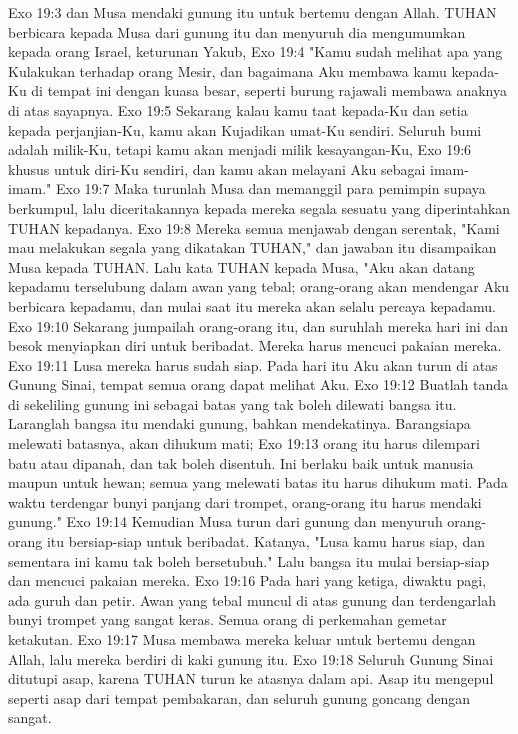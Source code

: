 Exo 19:3  dan Musa mendaki gunung itu untuk bertemu dengan Allah. TUHAN berbicara kepada Musa dari gunung itu dan menyuruh dia mengumumkan kepada orang Israel, keturunan Yakub,
Exo 19:4  "Kamu sudah melihat apa yang Kulakukan terhadap orang Mesir, dan bagaimana Aku membawa kamu kepada-Ku di tempat ini dengan kuasa besar, seperti burung rajawali membawa anaknya di atas sayapnya.
Exo 19:5  Sekarang kalau kamu taat kepada-Ku dan setia kepada perjanjian-Ku, kamu akan Kujadikan umat-Ku sendiri. Seluruh bumi adalah milik-Ku, tetapi kamu akan menjadi milik kesayangan-Ku,
Exo 19:6  khusus untuk diri-Ku sendiri, dan kamu akan melayani Aku sebagai imam-imam."
Exo 19:7  Maka turunlah Musa dan memanggil para pemimpin supaya berkumpul, lalu diceritakannya kepada mereka segala sesuatu yang diperintahkan TUHAN kepadanya.
Exo 19:8  Mereka semua menjawab dengan serentak, "Kami mau melakukan segala yang dikatakan TUHAN," dan jawaban itu disampaikan Musa kepada TUHAN. Lalu kata TUHAN kepada Musa, "Aku akan datang kepadamu terselubung dalam awan yang tebal; orang-orang akan mendengar Aku berbicara kepadamu, dan mulai saat itu mereka akan selalu percaya kepadamu.
Exo 19:10  Sekarang jumpailah orang-orang itu, dan suruhlah mereka hari ini dan besok menyiapkan diri untuk beribadat. Mereka harus mencuci pakaian mereka.
Exo 19:11  Lusa mereka harus sudah siap. Pada hari itu Aku akan turun di atas Gunung Sinai, tempat semua orang dapat melihat Aku.
Exo 19:12  Buatlah tanda di sekeliling gunung ini sebagai batas yang tak boleh dilewati bangsa itu. Laranglah bangsa itu mendaki gunung, bahkan mendekatinya. Barangsiapa melewati batasnya, akan dihukum mati;
Exo 19:13  orang itu harus dilempari batu atau dipanah, dan tak boleh disentuh. Ini berlaku baik untuk manusia maupun untuk hewan; semua yang melewati batas itu harus dihukum mati. Pada waktu terdengar bunyi panjang dari trompet, orang-orang itu harus mendaki gunung."
Exo 19:14  Kemudian Musa turun dari gunung dan menyuruh orang-orang itu bersiap-siap untuk beribadat. Katanya, "Lusa kamu harus siap, dan sementara ini kamu tak boleh bersetubuh." Lalu bangsa itu mulai bersiap-siap dan mencuci pakaian mereka.
Exo 19:16  Pada hari yang ketiga, diwaktu pagi, ada guruh dan petir. Awan yang tebal muncul di atas gunung dan terdengarlah bunyi trompet yang sangat keras. Semua orang di perkemahan gemetar ketakutan.
Exo 19:17  Musa membawa mereka keluar untuk bertemu dengan Allah, lalu mereka berdiri di kaki gunung itu.
Exo 19:18  Seluruh Gunung Sinai ditutupi asap, karena TUHAN turun ke atasnya dalam api. Asap itu mengepul seperti asap dari tempat pembakaran, dan seluruh gunung goncang dengan sangat.
